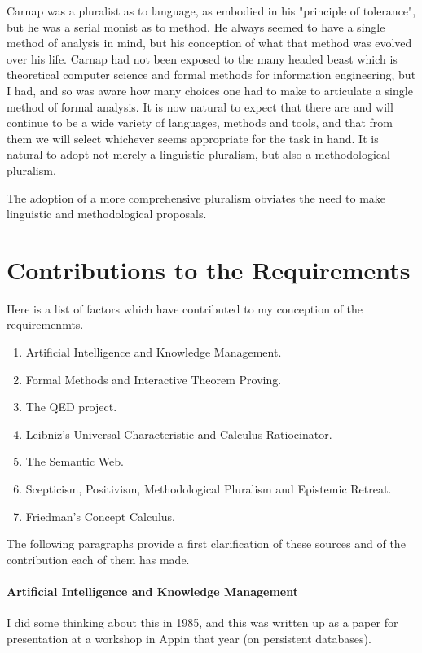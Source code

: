 Carnap was a pluralist as to language, as embodied in his "principle of tolerance", but he was a serial monist as to method.
He always seemed to have a single method of analysis in mind, but his conception of what that method was evolved over his life.
Carnap had not been exposed to the many headed beast which is theoretical computer science and formal methods for information engineering, but I had, and so was aware how many choices one had to make to articulate a single method of formal analysis.
It is now natural to expect that there are and will continue to be a wide variety of languages, methods and tools, and that from them we will select whichever seems appropriate for the task in hand.
It is natural to adopt not merely a linguistic pluralism, but also a methodological pluralism.

The adoption of a more comprehensive pluralism obviates the need to make linguistic and methodological proposals.


\section{Contributions to the Requirements}

Here is a list of factors which have contributed to my conception of the requiremenmts.

\begin{enumerate}
\item Artificial Intelligence and Knowledge Management.
\item Formal Methods and Interactive Theorem Proving.
\item The QED project.
\item Leibniz's Universal Characteristic and Calculus Ratiocinator.
\item The Semantic Web.
\item Scepticism, Positivism, Methodological Pluralism and Epistemic Retreat.
\item Friedman's Concept Calculus.
\end{enumerate}

The following paragraphs provide a first clarification of these sources and of the contribution each of them has made.

\paragraph{Artificial Intelligence and Knowledge Management}

I did some thinking about this in 1985, and this was written up as a paper for presentation at a workshop in Appin that year (on persistent databases)\cite{Jones85}.

